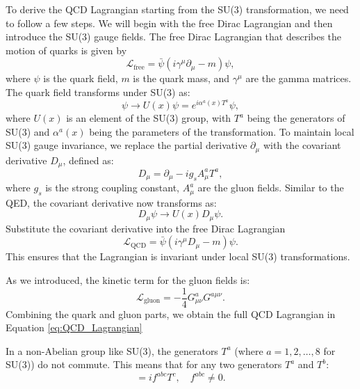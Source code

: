         To derive the QCD Lagrangian starting from the SU(3) transformation, we need to follow a few steps. 
        We will begin with the free Dirac Lagrangian and then introduce the SU(3) gauge fields. 
        The free Dirac Lagrangian that describes the motion of quarks is given by
        \begin{equation}
            \mathcal{L}_{\text{free}} = \bar{\psi}(i\gamma^\mu \partial_\mu - m)\psi,
        \end{equation}
        where $\psi$ is the quark field, $m$ is the quark mass, and $\gamma^\mu$
        are the gamma matrices.
        The quark field transforms under SU(3) as:
        \begin{equation}
            \psi \rightarrow U(x)\psi= e^{i\alpha^a(x)T^a}\psi,
        \end{equation}
        where $U(x)$ is an element of the SU(3) group, with $T^a$ being the generators of SU(3) 
        and $\alpha^a(x)$ being the parameters of the transformation.
        To maintain local SU(3) gauge invariance, we replace the partial derivative $\partial_\mu$
        with the covariant derivative $D_\mu$, defined as:
        \begin{equation}
            D_\mu = \partial_\mu - ig_s A_\mu^a T^a,
        \end{equation}
        where \(g_s\) is the strong coupling constant, \(A_\mu^a\) are the gluon fields.
        Similar to the QED, the covariant derivative now transforms as:
        \begin{equation}
            D_\mu\psi \rightarrow U(x)D_\mu\psi.
        \end{equation}
        Substitute the covariant derivative into the free Dirac Lagrangian
        \begin{equation}
            \mathcal{L}_{\text{QCD}} = \bar{\psi}(i\gamma^\mu D_\mu - m)\psi.
        \end{equation}
        This ensures that the Lagrangian is invariant under local SU(3) transformations.

        As we introduced, the kinetic term for the gluon fields is:
        \begin{equation}
            \mathcal{L}_{\text{gluon}} = -\frac{1}{4} G_{\mu\nu}^a G^{a\mu\nu}.
        \end{equation}
        Combining the quark and gluon parts, we obtain the full QCD Lagrangian in Equation \ref{eq:QCD_Lagrangian}

        In a non-Abelian group like SU(3), the generators \(T^a\) (where \(a = 1, 2, \ldots, 8\) 
        for SU(3)) do not commute. This means that for any two generators \(T^a\) and \(T^b\):
        \begin{equation}
            [T^a, T^b] = i f^{abc} T^c, \quad f^{abc} \neq 0.
        \end{equation}

